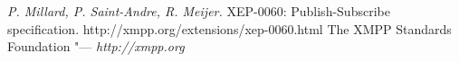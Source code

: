 \newpage
{}
\begin{thebibliography}{99}
\textit {P. Millard, P. Saint-Andre, R. Meijer.} XEP-0060: Publish-Subscribe
specification. http://xmpp.org/extensions/xep-0060.html
 The XMPP Standards Foundation "--- \textit{http://xmpp.org}


\end{thebibliography}